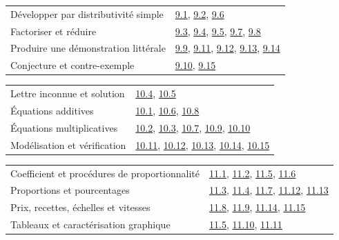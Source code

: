 \begin{tabularx}{\linewidth}{@{}Yl@{}}\toprule
Développer par distributivité simple & \hyperref[exo-9-1]{9.1}, \hyperref[exo-9-2]{9.2}, \hyperref[exo-9-6]{9.6}\\[2mm]
Factoriser et réduire & \hyperref[exo-9-3]{9.3}, \hyperref[exo-9-4]{9.4}, \hyperref[exo-9-5]{9.5}, \hyperref[exo-9-7]{9.7}, \hyperref[exo-9-8]{9.8}\\[2mm]
Produire une démonstration littérale & \hyperref[exo-9-9]{9.9}, \hyperref[exo-9-11]{9.11}, \hyperref[exo-9-12]{9.12}, \hyperref[exo-9-13]{9.13}, \hyperref[exo-9-14]{9.14}\\[2mm]
Conjecture et contre-exemple & \hyperref[exo-9-10]{9.10}, \hyperref[exo-9-15]{9.15}\\[2mm]
\bottomrule\end{tabularx}\par\vspace{4mm}
\clearpage
{}\fontsize{10}{13}\selectfont
{}\begin{tabularx}{\linewidth}{@{}Yl@{}}\toprule
Lettre inconnue et solution & \hyperref[exo-10-4]{10.4}, \hyperref[exo-10-5]{10.5}\\[2mm]
Équations additives & \hyperref[exo-10-1]{10.1}, \hyperref[exo-10-6]{10.6}, \hyperref[exo-10-8]{10.8}\\[2mm]
Équations multiplicatives & \hyperref[exo-10-2]{10.2}, \hyperref[exo-10-3]{10.3}, \hyperref[exo-10-7]{10.7}, \hyperref[exo-10-9]{10.9}, \hyperref[exo-10-10]{10.10}\\[2mm]
Modélisation et vérification & \hyperref[exo-10-11]{10.11}, \hyperref[exo-10-12]{10.12}, \hyperref[exo-10-13]{10.13}, \hyperref[exo-10-14]{10.14}, \hyperref[exo-10-15]{10.15}\\[2mm]
\bottomrule\end{tabularx}\par\vspace{4mm}
\begin{tabularx}{\linewidth}{@{}Yl@{}}\toprule
Coefficient et procédures de proportionnalité & \hyperref[exo-11-1]{11.1}, \hyperref[exo-11-2]{11.2}, \hyperref[exo-11-5]{11.5}, \hyperref[exo-11-6]{11.6}\\[2mm]
Proportions et pourcentages & \hyperref[exo-11-3]{11.3}, \hyperref[exo-11-4]{11.4}, \hyperref[exo-11-7]{11.7}, \hyperref[exo-11-12]{11.12}, \hyperref[exo-11-13]{11.13}\\[2mm]
Prix, recettes, échelles et vitesses & \hyperref[exo-11-8]{11.8}, \hyperref[exo-11-9]{11.9}, \hyperref[exo-11-14]{11.14}, \hyperref[exo-11-15]{11.15}\\[2mm]
Tableaux et caractérisation graphique & \hyperref[exo-11-5]{11.5}, \hyperref[exo-11-10]{11.10}, \hyperref[exo-11-11]{11.11}\\[2mm]
\bottomrule\end{tabularx}\par\vspace{4mm}
